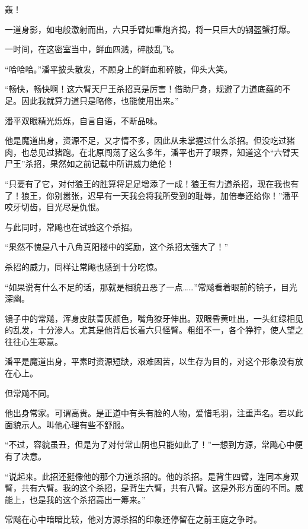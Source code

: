 
\begin{this_body}



轰！

一道身影，如电般激射而出，六只手臂如重炮齐捣，将一只巨大的钢盔蟹打爆。

一时间，在这密室当中，鲜血四溅，碎肢乱飞。

“哈哈哈。”潘平披头散发，不顾身上的鲜血和碎肢，仰头大笑。

“畅快，畅快啊！这六臂天尸王杀招真是厉害！借助尸身，规避了力道底蕴的不足。因此我就算力道只是略修，也能使用出来。”

潘平双眼精光烁烁，自言自语，不断品味。

他是魔道出身，资源不足，又才情不多，因此从未掌握过什么杀招。但没吃过猪肉，也总见过猪跑。在北原闯荡了这么多年，潘平也开了眼界，知道这个“六臂天尸王”杀招，果然如之前记载中所讲威力绝伦！

“只要有了它，对付狼王的胜算将足足增添了一成！狼王有力道杀招，现在我也有了！狼王，你别嚣张，迟早有一天我会将我所受到的耻辱，加倍奉还给你！”潘平咬牙切齿，目光尽是仇恨。

与此同时，常飚也在试验这个杀招。

“果然不愧是八十八角真阳楼中的奖励，这个杀招太强大了！”

杀招的威力，同样让常飚也感到十分吃惊。

“如果说有什么不足的话，那就是相貌丑恶了一点……”常飚看着眼前的镜子，目光深幽。

镜子中的常飚，浑身皮肤青灰颜色，嘴角獠牙伸出。双眼昏黄吐出，一头红绿相见的乱发，十分渗人。尤其是他背后长着六只怪臂。粗细不一，各个狰狞，使人望之往往心生寒意。

潘平是魔道出身，平素时资源短缺，艰难困苦，以生存为目的，对这个形象没有放在心上。

但常飚不同。

他出身常家。可谓高贵。是正道中有头有脸的人物，爱惜毛羽，注重声名。若以此面貌示人。叫他心理有些不舒服。

“不过，容貌虽丑，但是为了对付常山阴也只能如此了！”一想到方源，常飚心中便有了决意。

“说起来。此招还挺像他的那个力道杀招的。他的杀招。是背生四臂，连同本身双臂，共有六臂。我的这个杀招，是背生六臂，共有八臂。这是外形方面的不同。威能上，也是我的这个杀招高出一筹来。”

常飚在心中暗暗比较，他对方源杀招的印象还停留在之前王庭之争时。


\end{this_body}
